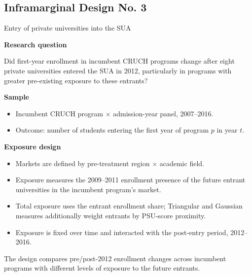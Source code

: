 \documentclass{beamer}
\begin{document}
\subsection{Inframarginal Design No. 3}
\begin{frame}{Entry of private universities into the SUA}

\footnotesize

\textbf{Research question}

Did first-year enrollment in incumbent CRUCH programs change after eight
private universities entered the SUA in 2012, particularly in programs with
greater pre-existing exposure to these entrants?

\vspace{0.10cm}

\textbf{Sample}

\begin{itemize}
    \item Incumbent CRUCH program $\times$ admission-year panel, 2007--2016.
    \item Outcome: number of students entering the first year of program $p$
    in year $t$.
\end{itemize}

\vspace{0.06cm}

\textbf{Exposure design}

\begin{itemize}
    \item Markets are defined by pre-treatment region $\times$ academic field.
    \item Exposure measures the 2009--2011 enrollment presence of the future
    entrant universities in the incumbent program's market.
    \item Total exposure uses the entrant enrollment share; Triangular and
    Gaussian measures additionally weight entrants by PSU-score proximity.
    \item Exposure is fixed over time and interacted with the post-entry
    period, 2012--2016.
\end{itemize}

\vspace{0.05cm}

\scriptsize
The design compares pre/post-2012 enrollment changes across incumbent programs
with different levels of exposure to the future entrants.

\end{frame}
\end{document}
